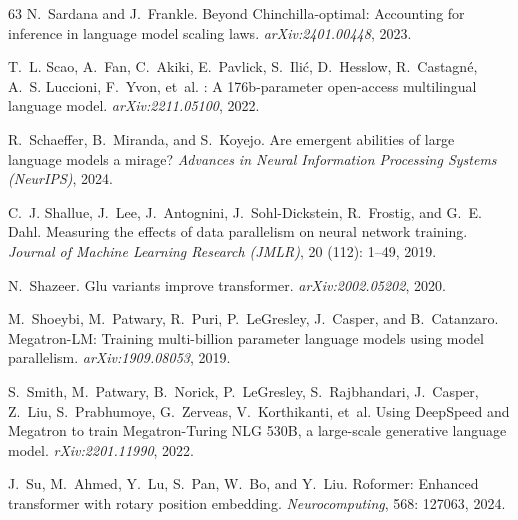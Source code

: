 \documentclass{article}
\theoremstyle{plain}
\theoremstyle{definition}
\theoremstyle{remark}
\begin{document}
\begin{thebibliography}{63}
N.~Sardana and J.~Frankle.
\newblock Beyond {C}hinchilla-optimal: Accounting for inference in language model scaling laws.
\newblock \emph{arXiv:2401.00448}, 2023.

T.~L. Scao, A.~Fan, C.~Akiki, E.~Pavlick, S.~Ili{\'c}, D.~Hesslow, R.~Castagn{\'e}, A.~S. Luccioni, F.~Yvon, et~al.
: A 176b-parameter open-access multilingual language model.
\newblock \emph{arXiv:2211.05100}, 2022.

R.~Schaeffer, B.~Miranda, and S.~Koyejo.
\newblock Are emergent abilities of large language models a mirage?
\newblock \emph{Advances in Neural Information Processing Systems (NeurIPS)}, 2024.

C.~J. Shallue, J.~Lee, J.~Antognini, J.~Sohl-Dickstein, R.~Frostig, and G.~E. Dahl.
\newblock Measuring the effects of data parallelism on neural network training.
\newblock \emph{Journal of Machine Learning Research (JMLR)}, 20 (112): 1--49, 2019.

N.~Shazeer.
\newblock Glu variants improve transformer.
\newblock \emph{arXiv:2002.05202}, 2020.

M.~Shoeybi, M.~Patwary, R.~Puri, P.~LeGresley, J.~Casper, and B.~Catanzaro.
\newblock Megatron-{LM}: Training multi-billion parameter language models using model parallelism.
\newblock \emph{arXiv:1909.08053}, 2019.

S.~Smith, M.~Patwary, B.~Norick, P.~LeGresley, S.~Rajbhandari, J.~Casper, Z.~Liu, S.~Prabhumoye, G.~Zerveas, V.~Korthikanti, et~al.
\newblock Using {D}eep{S}peed and {M}egatron to train {M}egatron-{T}uring {NLG} 530{B}, a large-scale generative language model.
\newblock \emph{rXiv:2201.11990}, 2022.

J.~Su, M.~Ahmed, Y.~Lu, S.~Pan, W.~Bo, and Y.~Liu.
\newblock Roformer: Enhanced transformer with rotary position embedding.
\newblock \emph{Neurocomputing}, 568: 127063, 2024.


\end{thebibliography}
\end{document}
